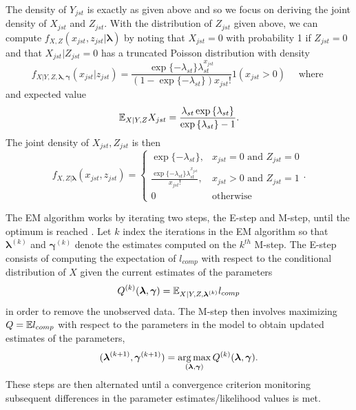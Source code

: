 The density of $Y_{jst}$ is exactly as given above and so we focus on deriving the joint density of $X_{jst}$ and $Z_{jst}$. With the distribution of $Z_{jst}$ given above, we can compute $f_{X,Z}(x_{jst},z_{jst}|\boldsymbol{\lambda})$ by noting that $X_{jst}=0$ with probability 1 if $Z_{jst}=0$ and that $X_{jst}|Z_{jst}=0$ has a truncated Poisson distribution with density
\begin{equation*}
  f_{X|Y,Z,\boldsymbol{\lambda},\boldsymbol{\gamma}}(x_{jst}|z_{jst}) =
  \frac{\exp{\{-\lambda_{st}\}} \lambda_{st}^{x_{jst}}}{(1 - \exp{\{-\lambda_{st}\}}) x_{jst}!}1(x_{jst} > 0) \quad \text{ where } 
\end{equation*}
and expected value
\[
\mathbb{E}_{X|Y,Z}X_{jst} = \frac{\lambda_{st} \exp{\{\lambda_{st} \}}}{\exp{\{ \lambda_{st} \}} - 1}.
\]
\noindent The joint density of $X_{jst}, Z_{jst}$ is then 
\begin{equation*}
    f_{X,Z|\boldsymbol{\lambda}}(x_{jst},z_{jst}) = \left\{
    \begin{array}{lr}
      \exp{\{ -\lambda_{st} \}}, & x_{jst}=0 \mbox{ and } Z_{jst} = 0 \\
      \frac{\exp{\{-\lambda_{st} \}} \lambda_{st}^{x_{jst}}}{x_{jst}!}, & x_{jst} > 0 \mbox{ and } Z_{jst} = 1\\
      0 & \mbox{otherwise}
    \end{array}
  \right..
\end{equation*}


The EM algorithm works by iterating two steps, the E-step and M-step, until the optimum is reached \citep{Dempster:1977,McLachlan:2007}.  Let $k$ index the iterations in the EM algorithm so that $\boldsymbol \lambda^{(k)}$ and $\boldsymbol \gamma^{(k)}$ denote the estimates computed on the $k^{th}$ M-step. The E-step consists of computing the expectation of $l_{comp}$ with respect to the conditional distribution of $X$ given the current estimates of the parameters
\[
Q^{(k)}(\boldsymbol{\lambda},\boldsymbol{\gamma}) = \mathbb{E}_{X|Y,Z,\boldsymbol{\lambda}^{(k)}} l_{comp}
\]
in order to remove the unobserved data. The M-step then involves maximizing $Q = \mathbb{E} l_{comp}$ with respect to the parameters in the model to obtain updated estimates of the parameters,
\[
(\boldsymbol{\lambda}^{(k+1)}, \boldsymbol{\gamma}^{(k+1)}) = \operatorname*{arg\,max}_{(\boldsymbol{\lambda}, \boldsymbol{\gamma})} Q^{(k)}(\boldsymbol{\lambda}, \boldsymbol{\gamma}).
\]
These steps are then alternated until a convergence criterion monitoring subsequent differences in the parameter estimates/likelihood values is met.  

